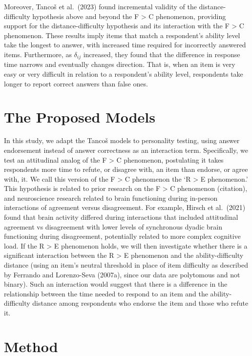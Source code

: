 \documentclass[
  number]{elsarticle}
\begin{document}
Moreover, Tancoš et al.~(2023) found incremental validity of the
distance-difficulty hypothesis above and beyond the F \textgreater{} C
phenomenon, providing support for the distance-difficulty hypothesis and
its interaction with the F \textgreater{} C phenomenon. These results
imply items that match a respondent's ability level take the longest to
answer, with increased time required for incorrectly answered items.
Furthermore, as \(\delta_{ij}\) increased, they found that the
difference in response time narrows and eventually changes direction.
That is, when an item is very easy or very difficult in relation to a
respondent's ability level, respondents take longer to report correct
answers than false ones.

\section{The Proposed Models}\label{the-proposed-models}

In this study, we adapt the Tancoš models to personality testing, using
answer endorsement instead of answer correctness as an interaction term.
Specifically, we test an attitudinal analog of the F \textgreater{} C
phenomenon, postulating it takes respondents more time to refute, or
disagree with, an item than endorse, or agree with, it. We call this
version of the F \textgreater{} C phenomenon the `R \textgreater{} E
phenomenon.' This hypothesis is related to prior research on the F
\textgreater{} C phenomenon (citation), and neuroscience research
related to brain functioning during in-person interactions of agreement
versus disagreement. For example, Hirsch et al.~(2021) found that brain
activity differed during interactions that included attitudinal
agreement vs disagreement with lower levels of synchronous dyadic brain
functioning during disagreement, potentially related to more complex
cognitive load. If the R \textgreater{} E phenomenon holds, we will then
investigate whether there is a significant interaction between the R
\textgreater{} E phenomenon and the ability-difficulty distance (using
an item's neutral threshold in place of item difficulty as described by
Ferrando and Lorenzo-Seva (2007a), since our data are polytomous and not
binary). Such an interaction would suggest that there is a difference in
the relationship between the time needed to respond to an item and the
ability-difficulty distance among respondents who endorse the item and
those who refute it.

\section{Method}\label{method}
\end{document}
